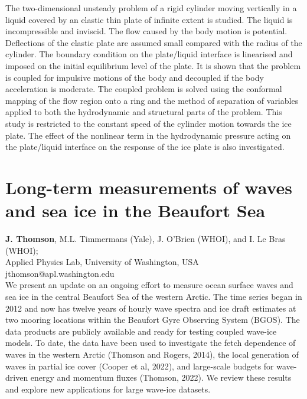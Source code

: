 \documentclass[9pt,a4paper,oneside]{book}
\numberwithin{equation}{section}
\begin{document}
The two-dimensional unsteady problem of a rigid cylinder moving vertically in a liquid covered by an elastic thin plate of infinite extent is studied. The liquid is incompressible and inviscid. The flow caused by the body motion is potential. Deflections of the elastic plate are assumed small compared with the radius of the
cylinder. The boundary condition on the plate/liquid interface is linearised and imposed on the initial equilibrium level of the plate. It is shown that the problem is coupled for impulsive motions of the body and decoupled if the body acceleration is moderate. The coupled problem is solved using the conformal mapping of the flow region onto a ring and the method of separation of variables applied to both the hydrodynamic and structural parts of the problem. This study is restricted to the constant speed of the cylinder motion towards the ice plate. The effect of the nonlinear term in the hydrodynamic pressure acting on the plate/liquid interface on the response of the ice plate is also investigated.

\section*{Long-term measurements of waves and sea ice in the Beaufort Sea}
 \label{abs:15}
  {\bf J. Thomson}, M.L. Timmermans (Yale), J. O'Brien (WHOI), and I. Le Bras (WHOI);\\
Applied Physics Lab, University of Washington, USA\\
jthomson@apl.washington.edu\\

We present an update on an ongoing effort to measure ocean surface waves and sea
ice in the central Beaufort Sea of the western Arctic. The time series began in 2012 and
now has twelve years of hourly wave spectra and ice draft estimates at two mooring
locations within the Beaufort Gyre Observing System (BGOS). The data products are
publicly available and ready for testing coupled wave-ice models. To date, the data
have been used to investigate the fetch dependence of waves in the western Arctic
(Thomson and Rogers, 2014), the local generation of waves in partial ice cover (Cooper
et al, 2022), and large-scale budgets for wave-driven energy and momentum fluxes
(Thomson, 2022). We review these results and explore new applications for large
wave-ice datasets.
\end{document}
